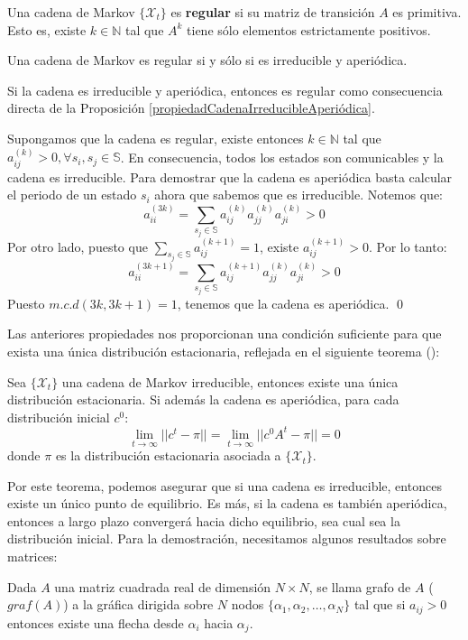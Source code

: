 \begin{definition}
Una cadena de Markov $\{\mathcal{X}_t\}$ es \textbf{regular} si su matriz de transición $A$ es primitiva. Esto es, existe $k\in\mathbb{N}$ tal que $A^k$ tiene sólo elementos estrictamente positivos.
\end{definition}

\begin{corollary}
    Una cadena de Markov es regular si y sólo si es irreducible y aperiódica.
\end{corollary}
\begin{proofs*}
Si la cadena es irreducible y aperiódica, entonces es regular como consecuencia directa de la Proposición \ref{propiedadCadenaIrreducibleAperiódica}.

Supongamos que la cadena es regular, existe entonces $k\in\mathbb{N}$ tal que $a_{ij}^{(k)}>0, \forall s_i,s_j\in\mathbb{S}$. En consecuencia, todos los estados son comunicables y la cadena es irreducible. Para demostrar que la cadena es aperiódica basta calcular el periodo de un estado $s_i$ ahora que sabemos que es irreducible. Notemos que:
\[a_{ii}^{(3k)}=\sum_{s_j\in\mathbb{S}}a_{ij}^{(k)} a_{jj}^{(k)} a_{ji}^{(k)}>0\]
Por otro lado, puesto que $\displaystyle\sum_{s_j\in\mathbb{S}}a_{ij}^{(k+1)}=1$, existe $a_{ij}^{(k+1)}>0$. Por lo tanto:
\[a_{ii}^{(3k+1)}=\sum_{s_j\in\mathbb{S}}a_{ij}^{(k+1)} a_{jj}^{(k)} a_{ji}^{(k)}>0\]
Puesto $m.c.d(3k,3k+1)=1$, tenemos que la cadena es aperiódica. \qed
\end{proofs*}


Las anteriores propiedades nos proporcionan una condición suficiente para que exista una única distribución estacionaria, reflejada en el siguiente teorema (\cite[Página 12]{JavierP}):
\begin{theorem}\label{ComportamientoAsintóticoMarkovIrreducible}
    Sea $\{\mathcal{X}_t\}$ una cadena de Markov irreducible, entonces existe una única distribución estacionaria. Si además la cadena es aperiódica, para cada distribución inicial $c^0$:
    \[\lim_{t\rightarrow\infty}||c^t-\pi||=\lim_{t\rightarrow\infty}||c^0A^t-\pi||=0\]
    donde $\pi$ es la distribución estacionaria asociada a $\{\mathcal{X}_t\}$.
\end{theorem}

Por este teorema, podemos asegurar que si una cadena es irreducible, entonces existe un único punto de equilibrio. Es más, si la cadena es también aperiódica, entonces a largo plazo convergerá hacia dicho equilibrio, sea cual sea la distribución inicial. Para la demostración, necesitamos algunos resultados sobre matrices:
\begin{definition}
Dada $A$ una matriz cuadrada real de dimensión $N\times N$, se llama grafo de $A$ ($graf(A)$) a la gráfica dirigida sobre $N$ nodos $\{\alpha_1, \alpha_2, \dots,\alpha_N\}$ tal que si $a_{ij}>0$ entonces existe una flecha desde $\alpha_i$ hacia $\alpha_j$.
\end{definition}

